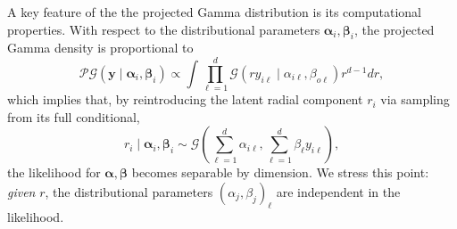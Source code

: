 \documentclass[12pt]{article}
\begin{document}
A key feature of the the projected Gamma distribution is its computational properties.  With respect to the distributional parameters $\bm{\alpha}_i,\bm{\beta}_i$, the projected Gamma density is proportional to
\begin{equation*}
    \mathcal{PG}(\bm{y}\mid\bm{\alpha}_i,\bm{\beta}_i) \propto \int\prod_{\ell = 1}^d\mathcal{G}\left(ry_{i\ell}\mid\alpha_{i\ell},\beta_{o\ell}\right)r^{d-1}dr,
\end{equation*}
which implies that, by reintroducing the latent radial component $r_i$ via sampling from its full conditional,
\begin{equation}
    r_i\mid\bm{\alpha}_i,\bm{\beta}_i \sim \mathcal{G}\left(\sum_{\ell = 1}^d\alpha_{i\ell}, \sum_{\ell = 1}^d\beta_{\ell} y_{i\ell}\right),
\end{equation}
the likelihood for $\bm{\alpha},\bm{\beta}$ becomes separable by dimension.  We stress this point: \emph{given} $r$, the distributional parameters $(\alpha_j,\beta_j)_{\ell}$ are independent in the likelihood.
\end{document}
